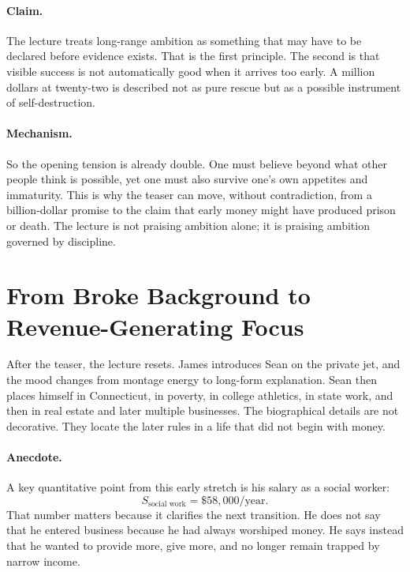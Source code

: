 \paragraph{Claim.}
The lecture treats long-range ambition as something that may have to be declared before evidence exists. That is the first principle. The second is that visible success is not automatically good when it arrives too early. A million dollars at twenty-two is described not as pure rescue but as a possible instrument of self-destruction.

\paragraph{Mechanism.}
So the opening tension is already double. One must believe beyond what other people think is possible, yet one must also survive one's own appetites and immaturity. This is why the teaser can move, without contradiction, from a billion-dollar promise to the claim that early money might have produced prison or death. The lecture is not praising ambition alone; it is praising ambition governed by discipline.

\section{From Broke Background to Revenue-Generating Focus}

After the teaser, the lecture resets. James introduces Sean on the private jet, and the mood changes from montage energy to long-form explanation. Sean then places himself in Connecticut, in poverty, in college athletics, in state work, and then in real estate and later multiple businesses. The biographical details are not decorative. They locate the later rules in a life that did not begin with money.

\paragraph{Anecdote.}
A key quantitative point from this early stretch is his salary as a social worker:
\begin{equation}
S_{\text{social work}} = \$58{,}000/\text{year}.
\end{equation}
That number matters because it clarifies the next transition. He does not say that he entered business because he had always worshiped money. He says instead that he wanted to provide more, give more, and no longer remain trapped by narrow income.

